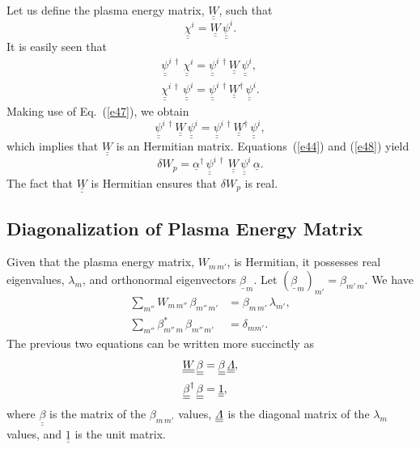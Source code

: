 \documentclass[12pt,prb,aps,notitlepage]{revtex4-1}
\begin{document}
Let us define the plasma energy matrix, $\underline{\underline{W}}$, such that 
\begin{equation}\label{e48}
\underline{\underline{\chi}}^i = \underline{\underline{W}}\,\underline{\underline{\psi}}^i.
\end{equation}
 It is easily seen that
 \begin{align}
 \underline{\underline{\psi}}^{i\,\dag}\,\underline{\underline{\chi}}^i= \underline{\underline{\psi}}^{i\,\dag}\underline{\underline{W}}\,
 \underline{\underline{\psi}}^i,\\[0.5ex]
 \underline{\underline{\chi}}^{i\,\dag}\,\underline{\underline{\psi}}^i= \underline{\underline{\psi}}^{i\,\dag}\underline{\underline{W}}^{\dag}\,
 \underline{\underline{\psi}}^i.
 \end{align}
 Making use of Eq.~(\ref{e47}), we obtain
 \begin{equation}
 \underline{\underline{\psi}}^{i\,\dag}\underline{\underline{W}}\,
 \underline{\underline{\psi}}^i=
 \underline{\underline{\psi}}^{i\,\dag}\underline{\underline{W}}^{\dag}\,
 \underline{\underline{\psi}}^i,
 \end{equation}
 which implies that $\underline{\underline{W}}$ is an Hermitian matrix. Equations~(\ref{e44}) and (\ref{e48}) yield
 \begin{equation}\label{e52}
 \delta W_p = \underline{\alpha}^\dag\,\underline{\underline{\psi}}^{i\,\dag}\,\underline{\underline{W}}\,\underline{\underline{\psi}}^i\,\underline{\alpha}.
 \end{equation}
 The fact that $\underline{\underline{W}}$ is Hermitian ensures that $\delta W_p$ is real. 

\subsection{Diagonalization of Plasma Energy Matrix}
Given that the plasma energy matrix, $W_{m\,m'}$, is Hermitian, it possesses real eigenvalues, $\lambda_m$, and orthonormal
eigenvectors $\underline{\beta}_m$. Let $(\underline{\beta}_m)_{m'} = \beta_{m'\,m}$. 
We have
\begin{align}
\sum_{m''} W_{m\,m''}\,\beta_{m''\,m'} &= \beta_{m\,m'}\,\lambda_{m'},\\[0.5ex]
\sum_{m''} \beta_{m''\,m}^\ast\,\beta_{m''\,m'} &= \delta_{mm'}.
\end{align}
The previous two equations can be written more succinctly as
\begin{align}
\underline{\underline{W}}\,\underline{\underline{\beta}}&=\underline{\underline{\beta}}\,\underline{\underline{{\mit\Lambda}}},\label{e55}\\[0.5ex]
\underline{\underline{\beta}}^\dag\,\underline{\underline{\beta}}&= \underline{\underline{1}},\label{e56}
\end{align}
where $\underline{\underline{\beta}}$ is the matrix of the $\beta_{m\,m'}$ values, $\underline{\underline{{\mit\Lambda}}}$ is the diagonal
matrix of the $\lambda_m$ values, and $\underline{\underline{1}}$ is the unit matrix. 
\end{document}
